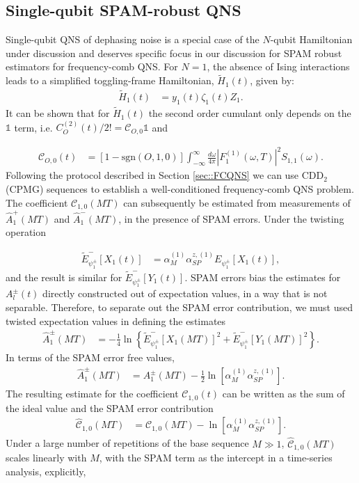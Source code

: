 \documentclass[%
 reprint,
superscriptaddress,
 amsmath,amssymb,
 aps,
pra,
]{revtex4-2}
\begin{document}
\smallskip

\subsection{Single-qubit SPAM-robust 
QNS}

Single-qubit QNS of dephasing noise is a special case of the $N$-qubit Hamiltonian under discussion and deserves specific focus in our discussion for SPAM robust estimators for frequency-comb QNS. For $N=1$, the absence of Ising interactions leads to a simplified toggling-frame Hamiltonian, $\tilde{H}_1(t)$, given by:
\begin{align}
    \tilde{H}_1(t)&=y_{1}(t)\zeta_1(t)Z_1.
\end{align}
It can be shown that for $\tilde{H}_1(t)$ the second order cumulant only depends on the $\mathbb{1}$ term, i.e. $C_O^{(2)}(t)/2!=\mathcal{C}_{O,0}\mathbb{1}$ \cite{PhysRevLett.107.230501} and

\begin{align}
    \mathcal{C}_{O,0}(t)&=\left[1-\text{sgn}(O,1,0)\right]\int_{-\infty}^\infty\frac{d\omega}{4\pi}\left|F_{1}^{(1)}(\omega,T)\right|^2S_{1,1}(\omega).
\end{align}
Following the protocol described in Section \ref{sec::FCQNS} we can use $\text{CDD}_2$ (CPMG) sequences to establish a well-conditioned frequency-comb QNS problem. The coefficient $\mathcal{C}_{1,0}(MT)$ can subsequently be estimated from measurements of $\hat{A}_1^+(MT)$ and $\hat{A}_1^-(MT)$, in the presence of SPAM errors. Under the twisting operation

\begin{align}
    \tilde{E}^-_{\psi^\pm_1}[X_1(t)]&=\alpha_M^{(1)}\alpha_{SP}^{z,(1)}E_{\psi^\pm_1}[X_1(t)],
\end{align}
and the result is similar for $\tilde{E}^-_{\psi^\pm_1}[Y_1(t)]$. SPAM errors bias the estimates for $A^\pm_l(t)$ directly constructed out of expectation values, in a way that is not separable. Therefore, to separate out the SPAM error contribution, we must used twisted expectation values in defining the estimates
\begin{align}
    \hat{A}^\pm_1(MT)&=-\frac{1}{4}\ln\left\{\tilde{E}^-_{\psi^\pm_1}[X_1(MT)]^2+\tilde{E}^-_{\psi^\pm_1}[Y_1(MT)]^2\right\}.
\end{align}
In terms of the SPAM error free values,
\begin{align}
    \hat{A}^\pm_1(MT)&=A^\pm_1(MT)-\frac{1}{2}\ln\left[\alpha_M^{(1)}\alpha_{SP}^{z,(1)}\right].
\end{align}
The resulting estimate for the coefficient $\mathcal{C}_{1,0}(t)$ can be written as the sum of the ideal value and the SPAM error contribution
\begin{align}
    \hat{\mathcal{C}}_{1,0}(MT)&=\mathcal{C}_{1,0}(MT)-\ln\left[\alpha_M^{(1)}\alpha_{SP}^{z,(1)}\right].
\end{align}
Under a large number of repetitions of the base sequence $M\gg1$, $\hat{\mathcal{C}}_{1,0}(MT)$ scales linearly with $M$, with the SPAM term as the intercept in a time-series analysis, explicitly,
\end{document}
